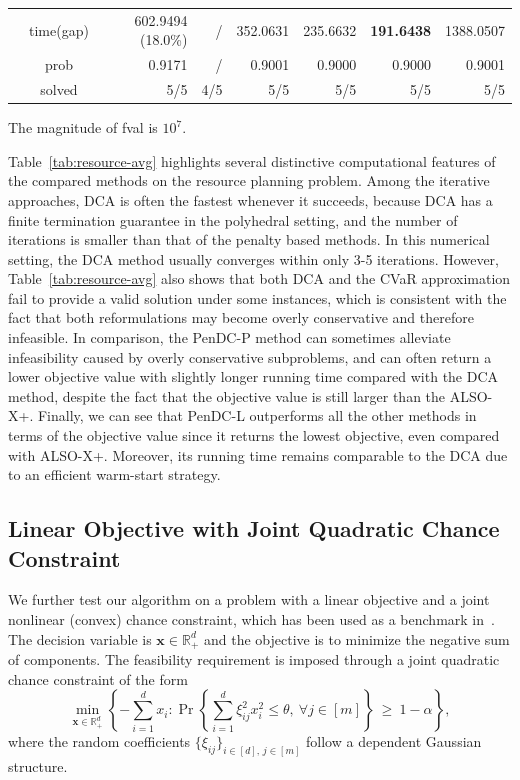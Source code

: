 \documentclass[11pt]{article}
\def\bs{\boldsymbol}
\def\Re{\mathbb{R}}
\begin{document}
\begin{table}[ht!]
\begin{tabular}{ccrrrrrr}
& time(gap)  & 602.9494 (18.0\%) & / & 352.0631 & 235.6632 & \textbf{191.6438} & 1388.0507\\
& prob  & 0.9171 & / & 0.9001 & 0.9000 & 0.9000 & 0.9001\\
& solved & 5/5 & 4/5 & 5/5 & 5/5 & 5/5 & 5/5\\
\bottomrule
\end{tabular}
\vspace{2pt}
\begin{flushleft}
\footnotesize \qquad *The magnitude of fval is $10^{7}$. \end{flushleft}
\end{table}

Table~\ref{tab:resource-avg} highlights several distinctive computational features of the compared methods on the resource planning problem.
Among the iterative approaches, DCA is often the fastest whenever it succeeds, because DCA has a finite termination guarantee in the polyhedral setting, and the number of iterations is smaller than that of the penalty based methods. In this numerical setting, the DCA method usually converges within only 3-5 iterations.
However, Table~\ref{tab:resource-avg} also shows that both DCA and the CVaR approximation fail to provide a valid solution under some instances, which is consistent with the fact that both reformulations may become overly conservative and therefore infeasible. 
In comparison, the PenDC-P method can sometimes alleviate infeasibility caused by overly conservative subproblems,
and can often return a lower objective value with slightly longer running time compared with the DCA method, despite the fact that the objective value is still larger than the ALSO-X+.
Finally, we can see that PenDC-L outperforms all the other methods in terms of the objective value since it returns the lowest objective, even compared with ALSO-X+. Moreover, its running time remains comparable to the DCA due to an efficient warm-start strategy.


\subsection{Linear Objective with Joint Quadratic Chance Constraint}

We further test our algorithm on a problem with a linear objective and a joint nonlinear (convex) chance constraint, which has been used as a benchmark in~\cite{hong2011sequential, wang2025proximal}. The decision variable is $\bs{x}\in\Re^d_{+}$ and the objective is to minimize the negative sum of components. The feasibility requirement is imposed through a joint quadratic chance constraint of the form
\[
\min_{\bs{x}\in\Re^d_{+}} \left\{ -\sum_{i=1}^d x_i
:
\Pr\left\{\sum_{i=1}^d \xi_{ij}^2 x_i^2 \le \theta,\ \forall j\in[m]\right\}\ \ge\ 1-\alpha\right\},
\]
where the random coefficients $\{\xi_{ij}\}_{i\in[d],\,j\in[m]}$ follow a dependent Gaussian structure. 
\end{document}

